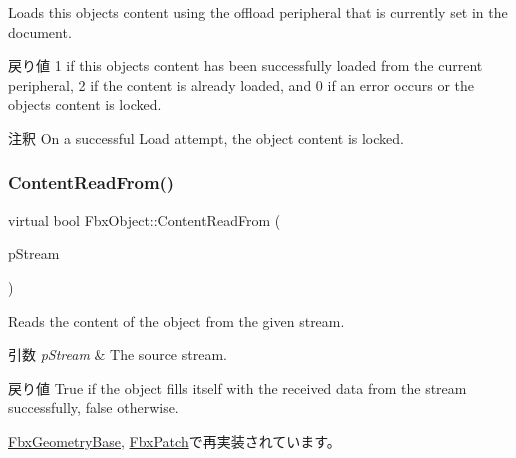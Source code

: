 Loads this object\textquotesingle{}s content using the offload peripheral that is currently set in the document. \begin{DoxyReturn}{戻り値}
1 if this object\textquotesingle{}s content has been successfully loaded from the current peripheral, 2 if the content is already loaded, and 0 if an error occurs or the object\textquotesingle{}s content is locked. 
\end{DoxyReturn}
\begin{DoxyRemark}{注釈}
On a successful Load attempt, the object content is locked. 
\end{DoxyRemark}
\mbox{\label{class_fbx_object_aeb4255bda633e1986730748758a7cf6c}} 
\subsubsection{\texorpdfstring{Content\+Read\+From()}{ContentReadFrom()}}
{\footnotesize\ttfamily virtual bool Fbx\+Object\+::\+Content\+Read\+From (\begin{DoxyParamCaption}\item[{const \hyperlink{class_fbx_stream}{Fbx\+Stream} \&}]{p\+Stream }\end{DoxyParamCaption})\hspace{0.3cm}{\ttfamily [virtual]}}

Reads the content of the object from the given stream. 
\begin{DoxyParams}{引数}
{\em p\+Stream} & The source stream. \\
\hline
\end{DoxyParams}
\begin{DoxyReturn}{戻り値}
{\ttfamily True} if the object fills itself with the received data from the stream successfully, {\ttfamily false} otherwise. 
\end{DoxyReturn}


\hyperlink{class_fbx_geometry_base_a6d34ab23d253b07cac24267177096c1a}{Fbx\+Geometry\+Base}, \hyperlink{class_fbx_patch_ad1aac4a2e0e820f27ff9a0123ba5756e}{Fbx\+Patch}で再実装されています。

\mbox{\label{class_fbx_object_ac28653a3c65e840498eebfb54276e483}} 
